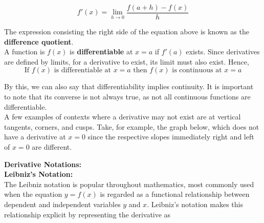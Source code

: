         \begin{equation*}
            f'(x) = \lim_{h\to 0} \frac{f(a+h)-f(x)}{h}
        \end{equation*}

        \noindent The expression consisting the right side of the equation above is known as the
        \textbf{difference quotient}. \\

        \noindent A function is $f(x)$ is \textbf{differentiable} at $x=a
        $ if $f'(a)$ exists. Since derivatives are defined by limits, for a derivative to exist,
        its limit must also exist. Hence, \\

        \begin{equation*}
            \text{If $f(x)$ is differentiable at $x=a$ then $f(x)$ is continuous at $x=a$}
        \end{equation*}

        \noindent By this, we can also say that differentiability implies continuity. It is
        important to note that its converse is not always true, as not all continuous functions
        are differentiable. \\


        \noindent A few examples of contexts where a derivative may not exist are at vertical
        tangents, corners, and cusps. Take, for example, the graph below, which does not have a
        derivative at $x=0$ since the respective slopes immediately right and left of $x=0$ are
        different. \\

        \begin{center}
        \end{center}

        \noindent \color{purple} \textbf{Derivative Notations:} \\
        \noindent \textbf{Leibniz's Notation:} \color{black} \\
        The Leibniz notation is popular throughout mathematics, most commonly used when the
        equation $y=f(x)$ is regarded as a functional relationship between dependent and
        independent variables $y$ and $x$. Leibniz's notation makes this relationship explicit
        by representing the derivative as \\

